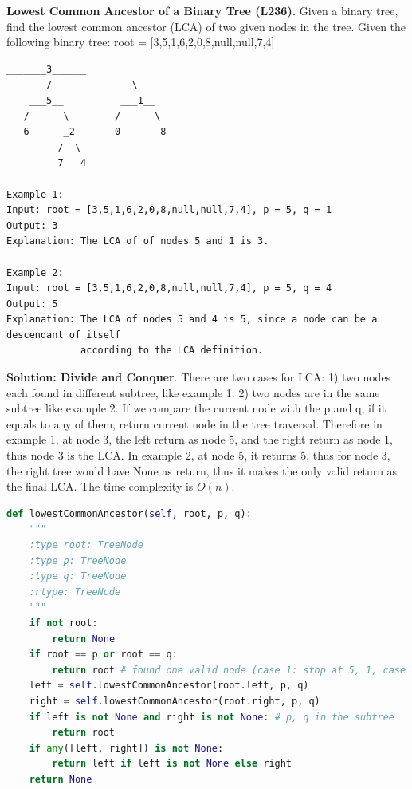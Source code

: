 \documentclass[../main.tex]{subfiles}
\begin{document}
\begin{examples}[resume]
\item \textbf{Lowest Common Ancestor of a Binary Tree (L236).}  Given a binary tree, find the lowest common ancestor (LCA) of two given nodes in the tree. Given the following binary tree:  root = [3,5,1,6,2,0,8,null,null,7,4]
\begin{lstlisting}[numbers=none]
        _______3______
       /              \
    ___5__          ___1__
   /      \        /      \
   6      _2       0       8
         /  \
         7   4

Example 1:
Input: root = [3,5,1,6,2,0,8,null,null,7,4], p = 5, q = 1
Output: 3
Explanation: The LCA of of nodes 5 and 1 is 3.

Example 2:
Input: root = [3,5,1,6,2,0,8,null,null,7,4], p = 5, q = 4
Output: 5
Explanation: The LCA of nodes 5 and 4 is 5, since a node can be a descendant of itself
             according to the LCA definition.
\end{lstlisting}
\textbf{Solution: Divide and Conquer}. There are two cases for LCA: 1) two nodes each found in different subtree, like example 1. 2) two nodes are in the same subtree like example 2. If we compare the current node with the p and q, if it equals to any of them, return current node in the tree traversal. Therefore in example 1, at node 3, the left return as node 5, and the right return as node 1, thus node 3 is the LCA. In example 2, at node 5, it returns 5, thus for node 3, the right tree would have None as return, thus it makes the only valid return as the final LCA. The time complexity is $O(n)$.
\begin{lstlisting}[language=Python]
def lowestCommonAncestor(self, root, p, q):
    """
    :type root: TreeNode
    :type p: TreeNode
    :type q: TreeNode
    :rtype: TreeNode
    """
    if not root:
        return None
    if root == p or root == q:
        return root # found one valid node (case 1: stop at 5, 1, case 2:stop at 5)
    left = self.lowestCommonAncestor(root.left, p, q)
    right = self.lowestCommonAncestor(root.right, p, q)
    if left is not None and right is not None: # p, q in the subtree
        return root 
    if any([left, right]) is not None:
        return left if left is not None else right
    return None
\end{lstlisting}
\end{examples}
\end{document}
